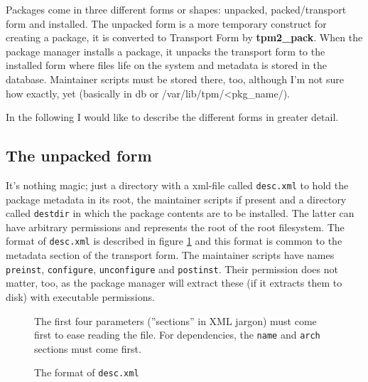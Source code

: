 \documentclass[a4paper]{scrartcl}
\newcommand{\file}[1]{\texttt{#1}}
\newcommand{\program}[1]{\textbf{#1}}
\begin{document}
	Packages come in three different forms or shapes: unpacked, packed/transport form and installed. The unpacked form is a more temporary construct for creating a package, it is converted to Transport Form by \program{tpm2\_pack}. When the package manager installs a package, it unpacks the transport form to the installed form where files life on the system and metadata is stored in the database. Maintainer scripts must be stored there, too, although I'm not sure how exactly, yet (basically in db or /var/lib/tpm/<pkg\_name/).
	
	In the following I would like to describe the different forms in greater detail.
	
	
	\subsection{The unpacked form}
	\label{ssec:the_unpacked_form}
	
	It's nothing magic; just a directory with a xml-file called \file{desc.xml} to hold the package metadata in its root, the maintainer scripts if present and a directory called \file{destdir} in which the package contents are to be installed. The latter can have arbitrary permissions and represents the root of the root filesystem. The format of \file{desc.xml} is described in figure \ref{fig:the_format_of_desc_xml} and this format is common to the metadata section of the transport form. The maintainer scripts have names \file{preinst}, \file{configure}, \file{unconfigure} and \file{postinst}. Their permission does not matter, too, as the package manager will extract these (if it extracts them to disk) with executable permissions.
	
	\begin{figure}[ht]
	
		\vspace{1eM}
	
		The first four parameters (''sections'' in XML jargon) must come first to ease reading the file. For dependencies, the \texttt{name} and \texttt{arch} sections must come first.
		
		\caption{The format of \file{desc.xml}}
		\label{fig:the_format_of_desc_xml}
	\end{figure}
	
\end{document}
